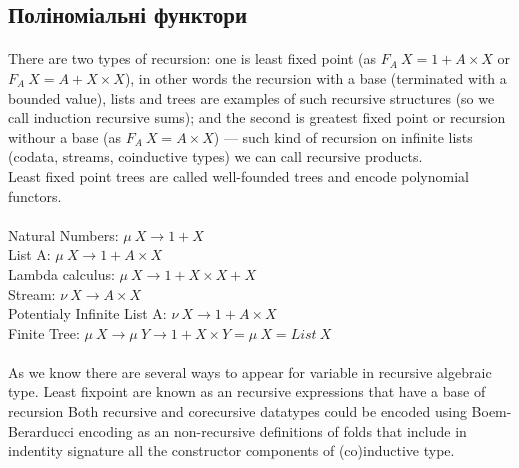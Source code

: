 \begin{definition}
\begin{definition}
\begin{definition}
\begin{definition}
  \subsection{Поліноміальні функтори}

  \paragraph{}
  There are two types of recursion: one is least fixed point (as $F_A\ X = 1 + A\times X$
  or $F_A\ X = A + X\times X$), in other words the recursion with a base (terminated with a bounded value),
  lists and trees are examples of such recursive structures (so we call induction recursive sums);
  and the second is greatest fixed point or recursion withour a base (as $F_A\ X = A\times X $) ---
  such kind of recursion on infinite lists (codata, streams, coinductive types) we can call recursive products.\\
  Least fixed point trees are called well-founded trees and encode polynomial functors.

  \paragraph{}
  Natural Numbers: $\mu\ X \rightarrow 1 + X$\\
  List A: $\mu\ X \rightarrow 1 + A \times X$\\
  Lambda calculus: $\mu\ X \rightarrow 1 + X \times X + X$\\
  Stream: $\nu\ X \rightarrow A \times X$\\
  Potentialy Infinite List A: $\nu\ X \rightarrow 1 + A \times X$\\
  Finite Tree: $\mu\ X \rightarrow \mu\ Y \rightarrow 1 + X \times Y = \mu\ X = List\ X$\\

  \paragraph{}
  As we know there are several ways to appear for variable in recursive algebraic type.
  Least fixpoint are known as an recursive expressions that have a base of recursion
  Both recursive and corecursive datatypes could be encoded using Boem-Berarducci encoding
  as an non-recursive definitions of folds that include in indentity signature all the
  constructor components of (co)inductive type.


\end{definition}
\end{definition}
\end{definition}
\end{definition}

